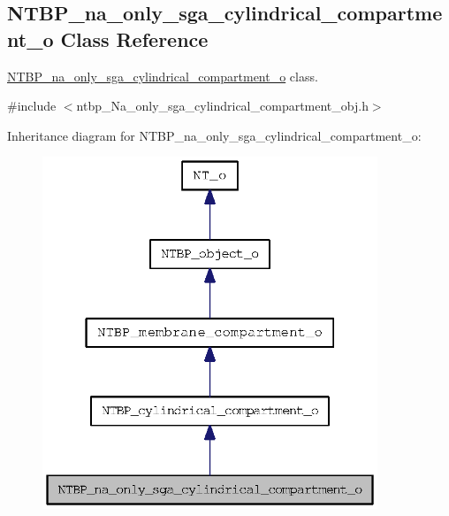 \subsection{NTBP\_\-na\_\-only\_\-sga\_\-cylindrical\_\-compartment\_\-o Class Reference}
\label{class_n_t_b_p__na__only__sga__cylindrical__compartment__o}


\hyperlink{class_n_t_b_p__na__only__sga__cylindrical__compartment__o}{NTBP\_\-na\_\-only\_\-sga\_\-cylindrical\_\-compartment\_\-o} class.  




{\ttfamily \#include $<$ntbp\_\-Na\_\-only\_\-sga\_\-cylindrical\_\-compartment\_\-obj.h$>$}



Inheritance diagram for NTBP\_\-na\_\-only\_\-sga\_\-cylindrical\_\-compartment\_\-o:
\nopagebreak
\begin{figure}[H]
\begin{center}
\leavevmode
\includegraphics[width=284pt]{class_n_t_b_p__na__only__sga__cylindrical__compartment__o__inherit__graph}
\end{center}
\end{figure}


